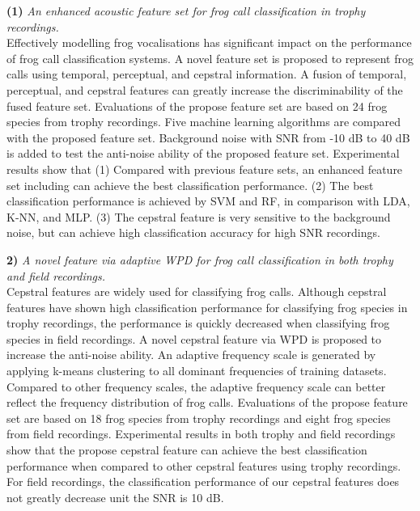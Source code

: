 \textbf{(1)} \textit{An enhanced acoustic feature set for frog call classification in trophy recordings.} 
\\
Effectively modelling frog vocalisations has significant impact on the performance of frog call classification systems. A novel feature set is proposed to represent frog calls using temporal, perceptual, and cepstral information. A fusion of temporal, perceptual, and cepstral features can greatly increase the discriminability of the fused feature set. Evaluations of the propose feature set are based on 24 frog species from trophy recordings. Five machine learning algorithms are compared with the proposed feature set. Background noise with SNR from -10 dB to 40 dB is added to test the anti-noise ability of the proposed feature set. Experimental results show that (1) Compared with previous feature sets, an enhanced feature set including  can achieve the best classification performance. (2) The best classification performance is achieved by SVM and RF, in comparison with LDA, K-NN, and MLP. (3) The cepstral feature is very sensitive to the background noise, but can achieve high classification accuracy for high SNR recordings. 

\textbf{2)} \textit{A novel feature via adaptive WPD for frog call classification in both trophy and field recordings.}
\\
Cepstral features are widely used for classifying frog calls. Although cepstral features have shown high classification performance for classifying frog species in trophy recordings, the performance is quickly decreased when classifying frog species in field recordings. A novel cepstral feature via WPD is proposed to increase the anti-noise ability. An adaptive frequency scale is generated by applying k-means clustering to all dominant frequencies of training datasets. Compared to other frequency scales, the adaptive frequency scale can better reflect the frequency distribution of frog calls. Evaluations of the propose feature set are based on 18 frog species from trophy recordings and eight frog species from field recordings. Experimental results in both trophy and field recordings show that the propose cepstral feature can achieve the best classification performance when compared to other cepstral features using trophy recordings. For field recordings, the classification performance of our cepstral features does not greatly decrease unit the SNR is 10 dB.




